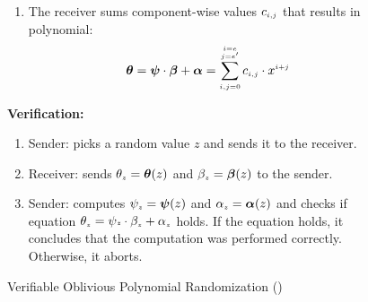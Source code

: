 \begin{figure}[ht]
\begin{center}
{\begin{tcolorbox}[enhanced,width=5.5in, 
    drop fuzzy shadow southwest,
    colframe=black,colback=white]
\begin{enumerate}
{\begin{enumerate}
 \item The receiver sums component-wise values $c_{\scriptscriptstyle i,j}$  that results in polynomial:
 \vspace{-2mm}
  $$\bm\theta=\bm\psi\cdot \bm\beta+\bm\alpha=\sum\limits^{\substack{\scriptscriptstyle i=e\\ \scriptscriptstyle j=e'}}_{\scriptscriptstyle i,j=0}c_{\scriptscriptstyle i, j}\cdot x^{\scriptscriptstyle i+j}$$ 
  \vspace{-2mm}
 




\end{enumerate}
\item \label{Verification} \textbf{Verification:}
\begin{enumerate}

\item \label{picking-random-x}Sender: picks a random value  $z$ and sends it to the receiver. 


\item\label{receiver-OLE-invocation} Receiver: sends $\theta_{\scriptscriptstyle z}=\bm\theta(z)$ and $\beta_{\scriptscriptstyle z}=\bm\beta(z)$ to the sender.

\item\label{receiver-OLE-invocation} Sender:  computes $\psi_{\scriptscriptstyle z}=\bm\psi(z)$ and $\alpha_{\scriptscriptstyle z}=\bm\alpha(z)$ and checks   if equation  $\theta_{\scriptscriptstyle z}=\psi{\scriptscriptstyle z}\cdot \beta_{\scriptscriptstyle z}+\alpha_{\scriptscriptstyle z}$ holds. If the equation holds, it concludes that the computation was performed correctly. Otherwise, it aborts. 
%
\end{enumerate}
}
 \end{enumerate}
 \end{tcolorbox}
 }
\end{center}
\caption{Verifiable Oblivious Polynomial Randomization ({\vopr}) } 
\label{fig:VOPR}
\end{figure}
